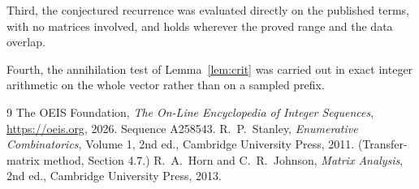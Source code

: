 \documentclass[11pt,a4paper]{article}
\theoremstyle{plain}
\theoremstyle{definition}
\begin{document}
Third, the conjectured recurrence was evaluated directly on the published terms, with no
matrices involved, and holds wherever the proved range and the data overlap.

Fourth, the annihilation test of Lemma~\ref{lem:crit} was carried out in exact integer
arithmetic on the whole vector rather than on a sampled prefix.

\begin{thebibliography}{9}
 The OEIS Foundation, \emph{The On-Line Encyclopedia of Integer
Sequences}, \url{https://oeis.org}, 2026. Sequence A258543.
 R.~P.~Stanley, \emph{Enumerative Combinatorics}, Volume 1, 2nd ed.,
Cambridge University Press, 2011. (Transfer-matrix method, Section 4.7.)
 R.~A.~Horn and C.~R.~Johnson, \emph{Matrix Analysis}, 2nd ed., Cambridge
University Press, 2013.
\end{thebibliography}
\end{document}
